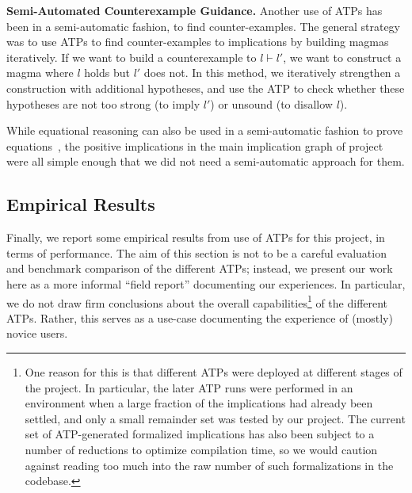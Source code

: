 \textbf{Semi-Automated Counterexample Guidance.}  Another use of ATPs has been in a semi-automatic fashion, to find counter-examples.
The general strategy was to use ATPs to find counter-examples to implications by building magmas iteratively.
If we want to build a counterexample to $l \vdash l'$, we want to construct a magma where $l$ holds but $l'$ does not.
In this method, we iteratively strengthen a construction with additional hypotheses, and use the ATP to check whether these hypotheses are not too strong (to imply $l'$) or unsound (to disallow $l$).


While equational reasoning can also be used in a semi-automatic fashion to prove equations~\cite{DBLP:journals/pacmpl/KoehlerGBGTS24}, the positive implications in the main implication graph of project were all simple enough that we did not need a semi-automatic approach for them.



\subsection{Empirical Results}

Finally, we report some empirical results from use of ATPs for this project, in terms of performance.
The aim of this section is not to be a careful evaluation and benchmark comparison of the different ATPs; instead, we present our work here as a more informal ``field report'' documenting our experiences.
In particular, we do not draw firm conclusions about the overall capabilities\footnote{One reason for this is that different ATPs were deployed at different stages of the project.  In particular, the later ATP runs were performed in an environment when a large fraction of the implications had already been settled, and only a small remainder set was tested by our project.  The current set of ATP-generated formalized implications has also been subject to a number of reductions to optimize compilation time, so we would caution against reading too much into the raw number of such formalizations in the codebase.} of the different ATPs.
Rather, this serves as a use-case documenting the experience of (mostly) novice users.

